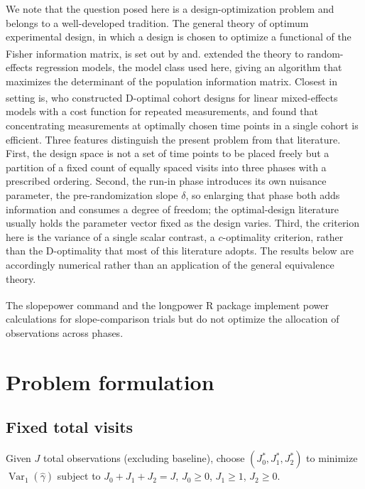 \documentclass[
  11pt,
]{article}
\begin{document}
We note that the question posed here is a
design-optimization problem and belongs to a
well-developed tradition. The general
theory of optimum experimental design, in which a design
is chosen to optimize a functional of the Fisher
information matrix, is set out by\textsuperscript{} and\textsuperscript{}.\textsuperscript{} extended the theory to
random-effects regression models, the model class used
here, giving an algorithm that maximizes the determinant
of the population information matrix. Closest in setting
is\textsuperscript{}, who constructed D-optimal cohort designs
for linear mixed-effects models with a cost function for
repeated measurements, and found that concentrating
measurements at optimally chosen time points in a single
cohort is efficient. Three features distinguish the
present problem from that literature. First, the design
space is not a set of time points to be placed freely
but a partition of a fixed count of equally spaced
visits into three phases with a prescribed ordering.
Second, the run-in phase introduces its own nuisance
parameter, the pre-randomization slope \(\delta\), so
enlarging that phase both adds information and consumes
a degree of freedom; the optimal-design literature
usually holds the parameter vector fixed as the design
varies. Third, the criterion here is the variance of a
single scalar contrast, a \(c\)-optimality criterion,
rather than the D-optimality that most of this
literature adopts. The results below are accordingly
numerical rather than an application of the general
equivalence theory.

The slopepower command\textsuperscript{} and the longpower
R package\textsuperscript{} implement power calculations
for slope-comparison trials but do not optimize the
allocation of observations across phases.

\section{Problem formulation}\label{problem-formulation}

\subsection{Fixed total visits}\label{fixed-total-visits}

Given \(J\) total observations (excluding baseline),
choose \((J_0^*, J_1^*, J_2^*)\) to minimize
\(\mathop{\mathrm{Var}}_1(\hat\gamma)\) subject to \(J_0 + J_1 + J_2 = J\),
\(J_0 \ge 0\), \(J_1 \ge 1\), \(J_2 \ge 0\).
\end{document}
